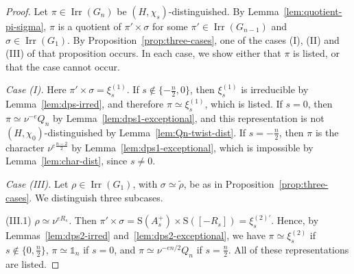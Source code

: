 \documentclass[11pt]{amsart}
\numberwithin{equation}{section}
\theoremstyle{plain}
\theoremstyle{definition}
\theoremstyle{remark}
\newcommand{\one}{\mathds{1}}
\DeclareMathOperator{\Irr}{Irr}
\newcommand{\xione}{\xi^{(1)}}
\newcommand{\xitwo}{\xi^{(2)}}
\newcommand{\Ss}{\mathrm{S}}
\begin{document}
\begin{proof}
	Let $\pi\in\Irr(G_n)$ be $(H,\chi_s)$-distinguished. By Lemma~\ref{lem:quotient-pi-sigma}, $\pi$ is a quotient of $\pi'\times\sigma$ for some $\pi'\in\Irr(G_{n-1})$ and $\sigma\in\Irr(G_1)$. By Proposition~\ref{prop:three-cases}, one of the cases (I), (II) and (III) of that proposition occurs. In each case, we show either that $\pi$ is listed, or that the case cannot occur.
	
	\emph{Case \textup{(I)}.} Here $\pi'\times\sigma=\xione_s$. If $s\notin\{-\frac n2,0\}$, then $\xione_s$ is irreducible by Lemma~\ref{lem:dps-irred}, and therefore $\pi\simeq\xione_s$, which is listed. If $s=0$, then $\pi\simeq\nu^{-e}Q_n$ by Lemma~\ref{lem:dps1-exceptional}, and this representation is not $(H,\chi_0)$-distinguished by Lemma~\ref{lem:Qn-twist-dist}. If $s=-\frac n2$, then $\pi$ is the character $\nu^{e\frac{n-2}2}$ by Lemma~\ref{lem:dps1-exceptional}, which is impossible by Lemma~\ref{lem:char-dist}, since $s\ne0$.
	
	\emph{Case \textup{(III)}.} Let $\rho\in\Irr(G_1)$, with $\sigma\simeq\widetilde\rho$, be as in Proposition~\ref{prop:three-cases}. We distinguish three subcases.
	
	(III.1) \emph{$\rho\simeq\nu^{eR_s}$.} Then $\pi'\times\sigma=\Ss(A_s^+)\times\Ss([-R_s])=\xi^{(2)\prime}_s$. Hence, by Lemmas~\ref{lem:dps2-irred} and~\ref{lem:dps2-exceptional}, we have $\pi\simeq\xitwo_s$ if $s\notin\{0,\frac n2\}$, $\pi\simeq\one_n$ if $s=0$, and $\pi\simeq\nu^{-en/2}Q_n$ if $s=\frac n2$. All of these representations are listed.
	

\end{proof}
\end{document}
